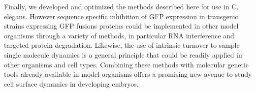  
 Finally, we developed and optimized the methods described here for use in C. elegans. However sequence specific inhibition of GFP expression in transgenic strains expressing GFP fusions proteins could be implemented in other model organisms through a variety of methods, in particular RNA interference and targeted protein degradation. Likewise, the use of intrinsic turnover to sample single molecule dynamics is a general principle that could be readily applied in other organisms and cell types. Combining these methods with molecular genetic tools already available in model organisms offers a promising new avenue to study cell surface dynamics in developing embryos.
